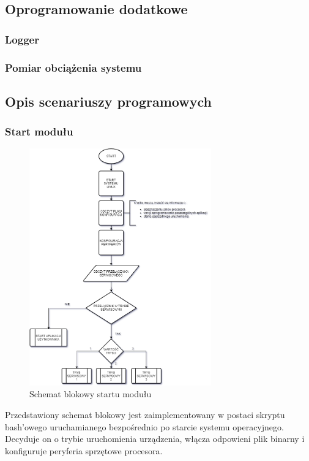 \documentclass[12pt, eng, twoside, openany, final]{mgr}
\begin{document}
                \subsection{Oprogramowanie dodatkowe}
                \subsubsection{Logger}
                \subsubsection{Pomiar obciążenia systemu}
                
                \newpage
                
                \subsection{Opis scenariuszy programowych}
                    \subsubsection{Start modułu}
                        \begin{figure}[H]
                        \begin{center}
                            \includegraphics[width=0.7\textwidth]{startup.png}
                            \caption{Schemat blokowy startu modułu} \label{fig:starup}
                        \end{center}
                        \end{figure}
                Przedstawiony schemat blokowy jest zaimplementowany w postaci skryptu bash'owego uruchamianego bezpośrednio po starcie systemu operacyjnego. Decyduje on o trybie uruchomienia urządzenia, włącza odpowieni plik binarny i konfiguruje peryferia sprzętowe procesora.
                \newpage
                        
\end{document}

